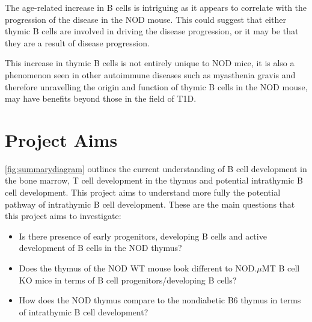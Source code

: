 The age-related increase in B cells is intriguing as it appears to correlate with the progression of the disease in the NOD mouse.
This could suggest that either thymic B cells are involved in driving the disease progression, or it may be that they are a result of disease progression.

This increase in thymic B cells is not entirely unique to NOD mice, it is also a phenomenon seen in other autoimmune diseases such as myasthenia gravis \citep{Vrolix2014, Christensson1988} and therefore unravelling the origin and function of thymic B cells in the NOD mouse, may have benefits beyond those in the field of T1D.


\section{Project Aims}

\cref{fig:summarydiagram} outlines the current understanding of B cell development in the bone marrow, T cell development in the thymus and potential intrathymic B cell development.
This project aims to understand more fully the potential pathway of intrathymic B cell development.
These are the main questions that this project aims to investigate:
\begin{itemize}
\item Is there presence of early progenitors, developing B cells and active development of B cells in the NOD thymus?
\item Does the thymus of the NOD WT mouse look different to NOD.$\mu$MT B cell KO mice in terms of B cell progenitors/developing B cells?
\item How does the NOD thymus compare to the nondiabetic B6 thymus in terms of intrathymic B cell development?
\end{itemize}


